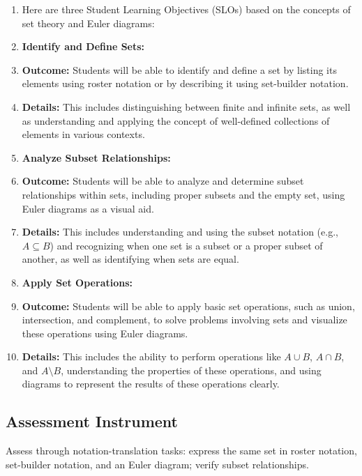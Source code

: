 \begin{enumerate}
    \item Here are three Student Learning Objectives (SLOs) based on the concepts of set theory and Euler diagrams:
    \item \textbf{Identify and Define Sets:}
    \item \textbf{Outcome:} Students will be able to identify and define a set by listing its elements using roster notation or by describing it using set-builder notation.
    \item \textbf{Details:} This includes distinguishing between finite and infinite sets, as well as understanding and applying the concept of well-defined collections of elements in various contexts.
    \item \textbf{Analyze Subset Relationships:}
    \item \textbf{Outcome:} Students will be able to analyze and determine subset relationships within sets, including proper subsets and the empty set, using Euler diagrams as a visual aid.
    \item \textbf{Details:} This includes understanding and using the subset notation (e.g., $A \subseteq B$) and recognizing when one set is a subset or a proper subset of another, as well as identifying when sets are equal.
    \item \textbf{Apply Set Operations:}
    \item \textbf{Outcome:} Students will be able to apply basic set operations, such as union, intersection, and complement, to solve problems involving sets and visualize these operations using Euler diagrams.
    \item \textbf{Details:} This includes the ability to perform operations like $A \cup B$, $A \cap B$, and $A \setminus B$, understanding the properties of these operations, and using diagrams to represent the results of these operations clearly.
\end{enumerate}


\subsection{Assessment Instrument}
\label{ssec:asse-3669}


Assess through notation-translation tasks: express the same set in
roster notation, set-builder notation, and an Euler diagram; verify
subset relationships.

